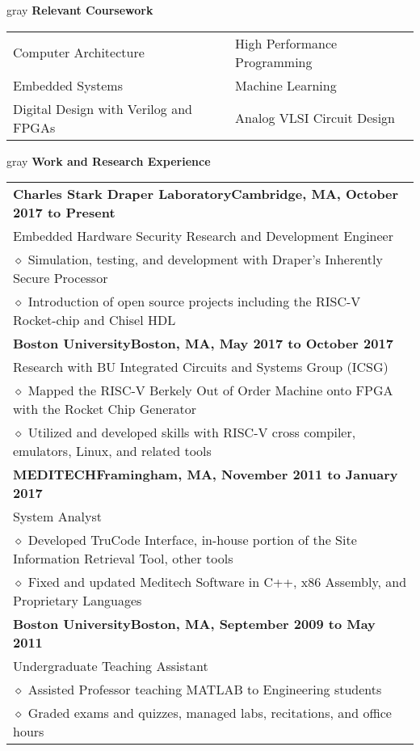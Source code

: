 \documentclass[10.5pt,letterpaper]{article}
\newcommand{\org}[1]{\textbf{#1}}
\newcommand{\pseudoitem}{\diamond}
\newcommand{\vertspace}{\vspace{1.2mm}}
\newcommand{\horzindent}{\hspace{3mm}}
\newcommand{\minorindent}{\hspace{4.5mm}}
\newcommand{\minoritem}{\minorindent $\pseudoitem$ }
\newcommand{\tablewidth}{.9\linewidth}
\newcommand{\undergrad}{Boston University}
\newcommand{\grad}{Boston University}
\begin{document}
	\vertspace
	\noindent	
	\begin{heading}{gray}
		\textbf{Relevant Coursework}
	\end{heading}
		\begin{tabular*}{\tablewidth}{@{\extracolsep{\fill}}ll}
			Computer Architecture & High Performance Programming \\
			Embedded Systems      & Machine Learning \\
			Digital Design with Verilog and FPGAs & Analog VLSI Circuit Design \\
		\end{tabular*}
		
	\fi
			
	\vertspace
	\noindent
	\begin{heading}{gray}
		\textbf{Work and Research Experience} 
	\end{heading}
		\begin{tabular*}{\tablewidth}{@{\extracolsep{\fill}}l}
		    \org{Charles Stark Draper Laboratory}\hfill \textbf{Cambridge, MA, October 2017 to Present}\\
		    \horzindent Embedded Hardware Security Research and Development Engineer\\
		    \minoritem Simulation, testing, and development with Draper's Inherently Secure Processor \\
		    \minoritem Introduction of open source projects including the RISC-V Rocket-chip and Chisel HDL\\	    
			\org{\grad}\hfill \textbf{Boston, MA, May 2017 to October 2017}\\
			\horzindent Research with BU Integrated Circuits and Systems Group (ICSG)\\
			\minoritem Mapped the RISC-V Berkely Out of Order Machine onto FPGA with the Rocket Chip Generator\\
			\minoritem Utilized and developed skills with RISC-V cross compiler, emulators, Linux, and related tools\\
			\org{MEDITECH}\hfill \textbf{Framingham, MA, November 2011 to January 2017}\\
			\horzindent System Analyst \\
			\minoritem Developed TruCode Interface, in-house portion of the Site Information Retrieval Tool, other tools \\
			\minoritem Fixed and updated Meditech Software in C++, x86 Assembly, and Proprietary Languages \\
			\org{\undergrad}\hfill \textbf{Boston, MA, September 2009 to May 2011}\\
			\horzindent Undergraduate Teaching Assistant \\
			\minoritem Assisted Professor teaching MATLAB to Engineering students \\
			\minoritem Graded exams and quizzes, managed labs, recitations, and office hours \\
		\end{tabular*}
	
\end{document}
